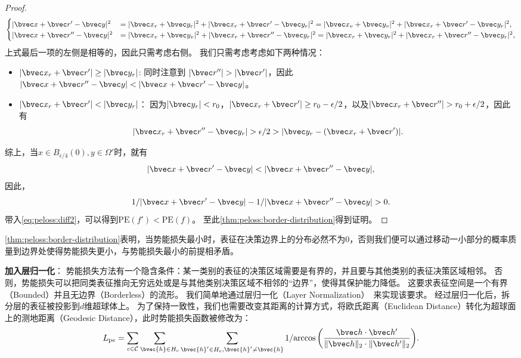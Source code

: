 \begin{proof}
\begin{equation}
\begin{cases}
    |\bvec x + \bvec r' - \bvec y|^2 & = |\bvec x_r + \bvec y_r|^2 + |\bvec x_r + \bvec r' - \bvec y_r|^2 
     = |\bvec x_v + \bvec y_v|^2 + |\bvec x_r + \bvec r' - \bvec y_r|^2, \\
    |\bvec x + \bvec r'' - \bvec y|^2 & = |\bvec x_v + \bvec y_v|^2 + |\bvec x_r + \bvec r'' - \bvec y_r|^2
    = |\bvec x_r + \bvec y_r|^2 + |\bvec x_r + \bvec r'' - \bvec y_r|^2,
\end{cases}
\end{equation}
上式最后一项的左侧是相等的，因此只需考虑右侧。
我们只需考虑考虑如下两种情况：
\begin{itemize}
    \item $|\bvec x_r + \bvec r'| \ge |\bvec y_r|$: 
    同时注意到 $|\bvec r''| > |\bvec r'|$，因此$|\bvec x + \bvec r'' - \bvec y| < |\bvec x + \bvec r' - \bvec y|$。
    \item $|\bvec x_r + \bvec r'| < |\bvec y_r|$：
    因为$|\bvec y_r| < r_0$，$|\bvec x_r + \bvec r'| \ge r_0 - \epsilon / 2$，以及$|\bvec x_r + \bvec r''| > r_0 + \epsilon / 2$，因此有
    \begin{equation}
        |\bvec x_r + \bvec r'' - \bvec y_r| > \epsilon / 2 > |\bvec y_r - (\bvec x_r + \bvec r')|.
    \end{equation}
\end{itemize}
综上，当$x \in B_{\epsilon/4}(0), y \in \Omega'$时，就有
\begin{equation}
    |\bvec x + \bvec r' - \bvec y| < |\bvec x + \bvec r'' - \bvec y|,
\end{equation}
因此，
\begin{equation}
    1 / |\bvec x + \bvec r' - \bvec y| - 1 / |\bvec x + \bvec r'' - \bvec y| > 0.
\end{equation}
带入\autoref{eq:peloss:diff2}，可以得到$\text{PE}(f') < \text{PE}(f)$。
至此\autoref{thm:peloss:border-distribution}得到证明。
\end{proof}

\autoref{thm:peloss:border-distribution}表明，当势能损失最小时，表征在决策边界上的分布必然不为0，否则我们便可以通过移动一小部分的概率质量到边界处使得势能损失更小，与势能损失最小的前提相矛盾。

\textbf{加入层归一化}：
势能损失方法有一个隐含条件：某一类别的表征的决策区域需要是有界的，并且要与其他类别的表征决策区域相邻。
否则，势能损失可以把同类表征推向无穷远处或是与其他类别决策区域不相邻的“边界”，使得其保护能力降低。
%
这要求表征空间是一个有界（Bounded）并且无边界（Borderless）的流形。
%
我们简单地通过层归一化（Layer Normalization）~\cite{hinton_2016_layernorm}来实现该要求。
%
经过层归一化后，拆分层的表征被投影到$d$维超球体上。
%
为了保持一致性，我们也需要改变其距离的计算方式，将欧氏距离（Euclidean Distance）转化为超球面上的测地距离（Geodesic Distance），此时势能损失函数被修改为：
\begin{equation}
    L_\text{pe} = \sum\limits_{c\in\mathcal C}\sum\limits_{\bvec{h} \in H_c}\sum\limits_{\bvec{h}' \in H_c, \bvec{h}' \ne \bvec{h}} {1}/{\arccos \left({\bvec h \cdot \bvec h'} \over {\Vert \bvec h \Vert_2 \cdot \Vert \bvec h' \Vert_2}\right)}.
\end{equation}
%

